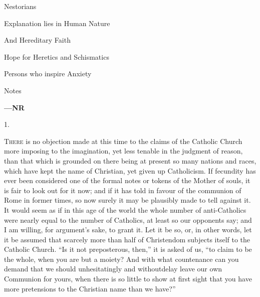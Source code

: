 Nestorians

Explanation lies in Human Nature

And Hereditary Faith

Hope for Heretics and Schismatics

Persons who inspire Anxiety

Notes

\textbf{—NR}

1.

T\textsc{here} is no objection made at this time to the claims of the
Catholic Church more imposing to the imagination, yet less tenable in
the judgment of reason, than that which is grounded on there being at
present so many nations and races, which have kept the name of
Christian, yet given up Catholicism. If fecundity has ever been
considered one of the formal notes or tokens of the Mother of souls,
it is fair to look out for it now; and if it has told in favour of the
communion of Rome in former times, so now surely it may be plausibly
made to tell against it. It would seem as if in this age of the world
the whole number of anti-Catholics were nearly equal to the number of
Catholics, at least so our opponents say; and I am willing, for
argument's sake, to grant it. Let it be so, or, in other words, let it
be assumed that scarcely more than half of Christendom subjects itself
to the Catholic Church. ``Is it not preposterous, then,'' it
is asked of us, ``to claim to be the whole, when you are but a
moiety? And with what countenance can you demand that we should
unhesitatingly and without\textbf{}delay leave our own Communion for
yours, when there is so little to show at first sight that you have
more pretensions to the Christian name than we have?''

